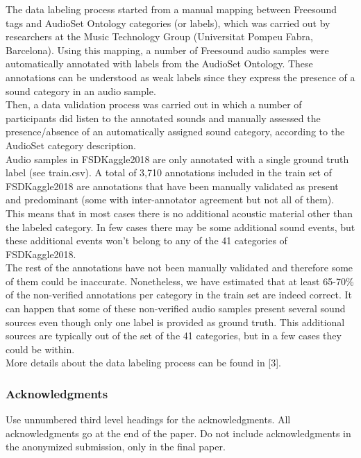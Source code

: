 \documentclass{article} %
\begin{document}
		The data labeling process started from a manual mapping between Freesound tags and AudioSet Ontology categories (or labels), which was carried out by researchers at the Music Technology Group (Universitat Pompeu Fabra, Barcelona). Using this mapping, a number of Freesound audio samples were automatically annotated with labels from the AudioSet Ontology. These annotations can be understood as weak labels since they express the presence of a sound category in an audio sample.\\
		\newline
		Then, a data validation process was carried out in which a number of participants did listen to the annotated sounds and manually assessed the presence/absence of an automatically assigned sound category, according to the AudioSet category description.\\
		\newline
		Audio samples in FSDKaggle2018 are only annotated with a single ground truth label (see train.csv). A total of 3,710 annotations included in the train set of FSDKaggle2018 are annotations that have been manually validated as present and predominant (some with inter-annotator agreement but not all of them). This means that in most cases there is no additional acoustic material other than the labeled category. In few cases there may be some additional sound events, but these additional events won't belong to any of the 41 categories of FSDKaggle2018.\\
		\newline
		The rest of the annotations have not been manually validated and therefore some of them could be inaccurate. Nonetheless, we have estimated that at least 65-70\% of the non-verified annotations per category in the train set are indeed correct. It can happen that some of these non-verified audio samples present several sound sources even though only one label is provided as ground truth. This additional sources are typically out of the set of the 41 categories, but in a few cases they could be within.\\
		\newline
		More details about the data labeling process can be found in [3].

\subsubsection*{Acknowledgments}

Use unnumbered third level headings for the acknowledgments. All
acknowledgments go at the end of the paper. Do not include 
acknowledgments in the anonymized submission, only in the 
final paper. 
\end{document}
